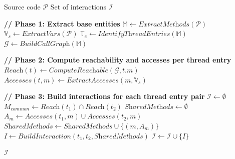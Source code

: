 \vspace{-0.5em}
{\footnotesize
\begin{algorithm}[h]
\caption{Interaction DSL Extraction}
\label{alg:interaction-extraction}
\begin{algorithmic}[1]
\Require Source code $\mathcal{P}$
\Ensure Set of interactions $\mathcal{I}$

\State \textbf{// Phase 1: Extract base entities}
\State $\mathbb{M} \gets \textit{ExtractMethods}(\mathcal{P})$
\State $\mathbb{V}_s \gets \textit{ExtractVars}(\mathcal{P})$
\State $\mathbb{T}_e \gets \textit{IdentifyThreadEntries}(\mathbb{M})$
\State $\mathcal{G} \gets \textit{BuildCallGraph}(\mathbb{M})$

\State \textbf{// Phase 2: Compute reachability and accesses per thread entry}
    \State $\textit{Reach}(t) \gets \textit{ComputeReachable}(\mathcal{G}, t.m)$
        \State $\textit{Accesses}(t, m) \gets \textit{ExtractAccesses}(m, \mathbb{V}_s)$
    \EndFor
\EndFor

\State \textbf{// Phase 3: Build interactions for each thread entry pair}
\State $\mathcal{I} \gets \emptyset$
    \State $M_{common} \gets \textit{Reach}(t_1) \cap \textit{Reach}(t_2)$
    \State $\textit{SharedMethods} \gets \emptyset$
        \State $A_m \gets \textit{Accesses}(t_1, m) \cup \textit{Accesses}(t_2, m)$
            \State $\textit{SharedMethods} \gets \textit{SharedMethods} \cup \{(m, A_m)\}$
        \EndIf
    \EndFor
        \State $I \gets \textit{BuildInteraction}(t_1, t_2, \textit{SharedMethods})$
        \State $\mathcal{I} \gets \mathcal{I} \cup \{I\}$
    \EndIf
\EndFor

\State \Return $\mathcal{I}$
\end{algorithmic}
\end{algorithm}
}
\vspace{-0.5em}



